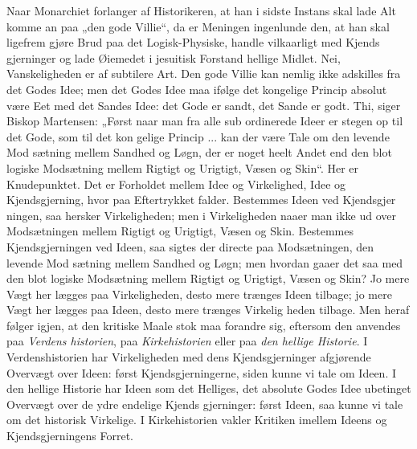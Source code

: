 \documentclass[12pt]{book}
\newcommand{\opage}[1]{\marginnote{\footnotesize\textit{[#1]}}}
\begin{document}
Naar Monarchiet forlanger af Historikeren, at han i
sidste Instans skal lade Alt komme an paa „den gode Villie“,
da er Meningen ingenlunde den, at han skal ligefrem gjøre
Brud paa det Logisk-Physiske, handle vilkaarligt med Kjends\-%
gjerninger og lade Øiemedet i jesuitisk Forstand hellige Midlet.
Nei, Vanskeligheden er af subtilere Art. Den gode Villie
kan nemlig ikke adskilles fra det Godes Idee; men det Godes
Idee maa ifølge det kongelige Princip absolut være Eet med
det Sandes Idee: det Gode er sandt, det Sande er godt.
\opage{42}\setcounter{footnote}{0}%
Thi, siger Biskop Martensen: „Først naar man fra alle sub\-%
ordinerede Ideer er stegen op til det Gode, som til det kon\-%
gelige Princip ... kan der være Tale om den levende Mod\-%
sætning mellem Sandhed og Løgn, der er noget heelt Andet
end den blot logiske Modsætning mellem Rigtigt og Urigtigt,
Væsen og Skin“. Her er Knudepunktet. Det er Forholdet
mellem Idee og Virkelighed, Idee og Kjendsgjerning, hvor\-%
paa Eftertrykket falder. Bestemmes Ideen ved Kjendsgjer\-%
ningen, saa hersker Virkeligheden; men i Virkeligheden naaer
man ikke ud over Modsætningen mellem Rigtigt og Urigtigt,
Væsen og Skin. Bestemmes Kjendsgjerningen ved Ideen,
saa sigtes der directe paa Modsætningen, den levende Mod\-%
sætning mellem Sandhed og Løgn; men hvordan gaaer det
saa med den blot logiske Modsætning mellem Rigtigt og
Urigtigt, Væsen og Skin? Jo mere Vægt her lægges paa
Virkeligheden, desto mere trænges Ideen tilbage; jo mere
Vægt her lægges paa Ideen, desto mere trænges Virkelig\-%
heden tilbage. Men heraf følger igjen, at den kritiske Maale\-%
stok maa forandre sig, eftersom den anvendes paa \emph{Verdens\-%
historien}, paa \emph{Kirkehistorien} eller paa \emph{den hellige
Historie}. I Verdenshistorien har Virkeligheden med dens
Kjendsgjerninger afgjørende Overvægt over Ideen: først
Kjendsgjerningerne, siden kunne vi tale om Ideen. I den
hellige Historie har Ideen som det Helliges, det absolute
Godes Idee ubetinget Overvægt over de ydre endelige Kjends\-%
gjerninger: først Ideen, saa kunne vi tale om det historisk
Virkelige. I Kirkehistorien vakler Kritiken imellem Ideens
og Kjendsgjerningens Forret.
\end{document}
